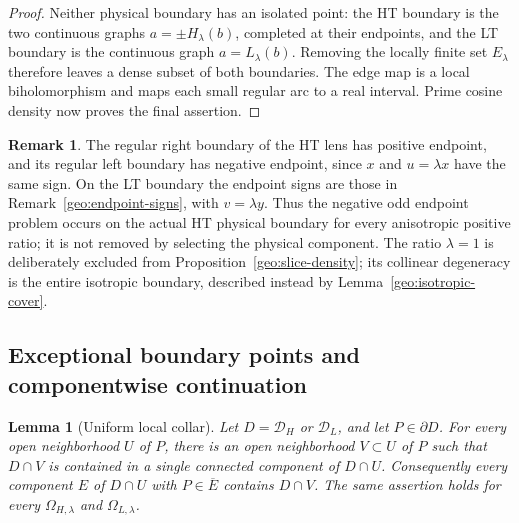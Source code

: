 \documentclass[11pt]{article}
\numberwithin{equation}{section}
\newtheorem{lemma}[theorem]{Lemma}
\theoremstyle{definition}
\newtheorem{remark}[theorem]{Remark}
\renewcommand{\DH}{\mathcal D_H}
\newcommand{\DL}{\mathcal D_L}
\begin{document}
\begin{proof}
Neither physical boundary has an isolated point:
the HT boundary is the two continuous graphs
\(a=\pm H_\lambda(b)\), completed at their endpoints,
and the LT boundary is the continuous graph
\(a=L_\lambda(b)\).
Removing the locally finite set \(E_\lambda\)
therefore leaves a dense subset of both boundaries.
The edge map is a local biholomorphism and maps each
small regular arc to a real interval.  Prime cosine
density now proves the final assertion.
\end{proof}

\begin{remark}\label{geo:slice-signs}
The regular right boundary of the HT lens has positive
endpoint, and its regular left boundary has negative
endpoint, since \(x\) and \(u=\lambda x\) have the
same sign.  On the LT boundary the endpoint signs
are those in Remark~\ref{geo:endpoint-signs}, with
\(v=\lambda y\).  Thus the negative odd endpoint
problem occurs on the actual HT physical boundary
for every anisotropic positive ratio; it is not
removed by selecting the physical component.
The ratio \(\lambda=1\) is deliberately excluded from
Proposition~\ref{geo:slice-density}; its collinear
degeneracy is the entire isotropic boundary, described
instead by Lemma~\ref{geo:isotropic-cover}.
\end{remark}

\subsection{Exceptional boundary points and componentwise continuation}
\label{geo:continuation-section}

\begin{lemma}[Uniform local collar]\label{geo:collar}
Let \(D=\DH\) or \(\DL\), and let \(P\in\partial D\).
For every open neighborhood \(U\) of \(P\), there is
an open neighborhood \(V\subset U\) of \(P\) such
that \(D\cap V\) is contained in a single connected
component of \(D\cap U\).
Consequently every component \(E\) of \(D\cap U\)
with \(P\in\overline E\) contains \(D\cap V\).
The same assertion holds for every
\(\Omega_{H,\lambda}\) and \(\Omega_{L,\lambda}\).
\end{lemma}
\end{document}
